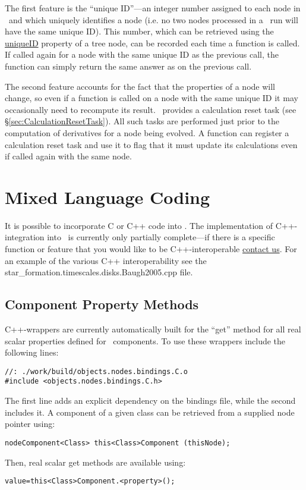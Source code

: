 The first feature is the ``unique ID''---an integer number assigned to each node in \glc\ and which uniquely identifies a node (i.e. no two nodes processed in a \glc\ run will have the same unique ID). This number, which can be retrieved using the \href{method:uniqueID}{{\normalfont \ttfamily uniqueID}} property of a tree node, can be recorded each time a function is called. If called again for a node with the same unique ID as the previous call, the function can simply return the same answer as on the previous call.

The second feature accounts for the fact that the properties of a node will change, so even if a function is called on a node with the same unique ID it may occasionally need to recompute its result. \glc\ provides a calculation reset task (see \S\ref{sec:CalculationResetTask}). All such tasks are performed just prior to the computation of derivatives for a node being evolved. A function can register a calculation reset task and use it to flag that it must update its calculations even if called again with the same node.

\section{Mixed Language Coding}\label{sec:MixedLanguageCoding}

It is possible to incorporate C or C++ code into \glc. The implementation of C++-integration into \glc\ is currently only partially complete---if there is a specific function or feature that you would like to be C++-interoperable \href{mailto:abenson@.carnegiescience.edu}{contact us}. For an example of the various C++ interoperability see the {\normalfont \ttfamily star\_formation.timescales.disks.Baugh2005.cpp} file.

\subsection{Component Property Methods}

C++-wrappers are currently automatically built for the ``get'' method for all real scalar properties defined for \glc\ components. To use these wrappers include the following lines:
\begin{verbatim}
//: ./work/build/objects.nodes.bindings.C.o
#include <objects.nodes.bindings.C.h>
\end{verbatim}
The first line adds an explicit dependency on the bindings file, while the second includes it. A component of a given class can be retrieved from a supplied node pointer using:
\begin{verbatim}
nodeComponent<Class> this<Class>Component (thisNode);
\end{verbatim}
Then, real scalar get methods are available using:
\begin{verbatim}
value=this<Class>Component.<property>();
\end{verbatim}

